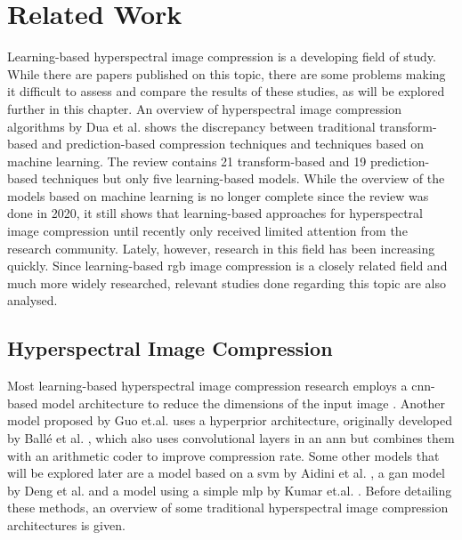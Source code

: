 \chapter{Related Work\label{cha:chapter2}}
Learning-based hyperspectral image compression is a developing field of study. While there are papers published on this topic, there are some problems making it difficult to assess and compare the results of these studies, as will be explored further in this chapter. An overview of hyperspectral image compression algorithms by Dua et al. \citep{dua_comprehensive_2020} shows the discrepancy between traditional transform-based and prediction-based compression techniques and techniques based on machine learning. The review contains 21 transform-based and 19 prediction-based techniques but only five learning-based models. While the overview of the models based on machine learning is no longer complete since the review was done in 2020, it still shows that learning-based approaches for hyperspectral image compression until recently only received limited attention from the research community. Lately, however, research in this field has been increasing quickly.
Since learning-based \ac{rgb} image compression is a closely related field and much more widely researched, relevant studies done regarding this topic are also analysed.
\section{Hyperspectral Image Compression \label{sec:ch2hyperspectral}}
Most learning-based hyperspectral image compression research employs a \ac{cnn}-based model architecture to reduce the dimensions of the input image \citep{kuester_1d-convolutional_2021,kuester_transferability_2022,la_grassa_hyperspectral_2022}. Another model proposed by Guo et.al. \citep{guo_learned_2021} uses a hyperprior architecture, originally developed by Ballé et al. \citep{balle_end--end_2017}, which also uses convolutional layers in an \ac{ann} but combines them with an arithmetic coder to improve compression rate.
Some other models that will be explored later are a model based on a \ac{svm} by Aidini et al. \citep{aidini_hyperspectral_2019}, a \ac{gan} model by Deng et al. \citep{deng_learning-based_2020} and a model using a simple \ac{mlp} by Kumar et.al. \citep{leal-taixe_onboard_2019}. Before detailing these methods, an overview of some traditional hyperspectral image compression architectures is given.
